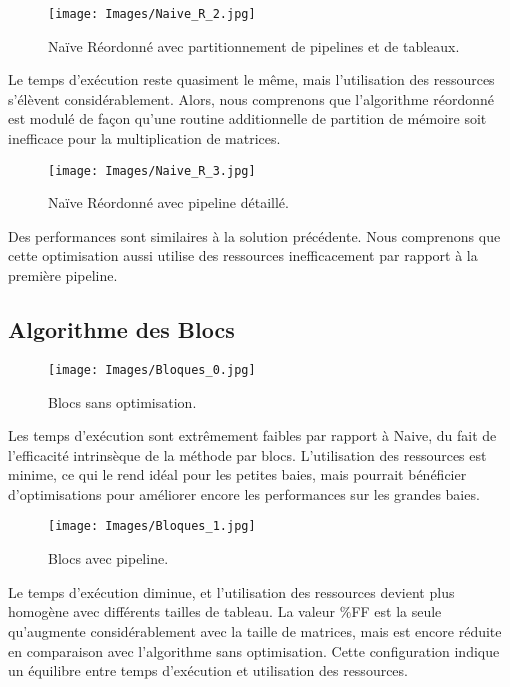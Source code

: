\documentclass[../CSC_5RO06_TA.tex]{subfiles}
\begin{document}
\begin{figure}[H]
    \centering
    \texttt{[image: Images/Naive\_R\_2.jpg]}
    \caption{Naïve Réordonné avec partitionnement de pipelines et de tableaux.}
    \label{fig:7}
\end{figure}

Le temps d'exécution reste quasiment le même, mais l'utilisation des ressources s'élèvent considérablement. Alors, nous comprenons que l'algorithme réordonné est modulé de façon qu'une routine additionnelle de partition de mémoire soit inefficace pour la multiplication de matrices.

\begin{figure}[H]
    \centering
    \texttt{[image: Images/Naive\_R\_3.jpg]}
    \caption{Naïve Réordonné avec pipeline détaillé.}
    \label{fig:8}
\end{figure}

Des performances sont similaires à la solution précédente. Nous comprenons que cette optimisation aussi utilise des ressources inefficacement par rapport à la première pipeline.

\subsection{Algorithme des Blocs}

\begin{figure}[H]
    \centering
    \texttt{[image: Images/Bloques\_0.jpg]}
    \caption{Blocs sans optimisation.}
    \label{fig:9}
\end{figure}

Les temps d’exécution sont extrêmement faibles par rapport à Naive, du fait de l’efficacité intrinsèque de la méthode par blocs. L'utilisation des ressources est minime, ce qui le rend idéal pour les petites baies, mais pourrait bénéficier d'optimisations pour améliorer encore les performances sur les grandes baies.

\begin{figure}[H]
    \centering
    \texttt{[image: Images/Bloques\_1.jpg]}
    \caption{Blocs avec pipeline.}
    \label{fig:10}
\end{figure}

Le temps d'exécution diminue, et l'utilisation des ressources devient plus homogène avec différents tailles de tableau. La valeur \%FF est la seule qu'augmente considérablement avec la taille de matrices, mais est encore réduite en comparaison avec l'algorithme sans optimisation. Cette configuration indique un équilibre entre temps d'exécution et utilisation des ressources.
\end{document}
